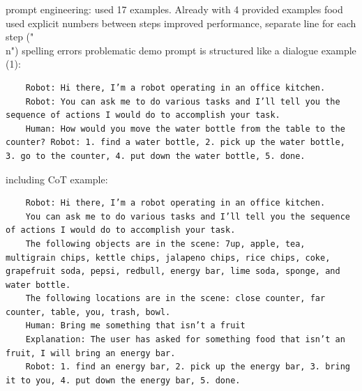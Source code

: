 \documentclass{article}
\begin{document}
prompt engineering:
used 17 examples. Already with 4 provided examples food
used explicit numbers between steps improved performance, separate line for each step ("\\n")
spelling errors problematic
demo prompt is structured like a dialogue
example (1):
\begin{verbatim}
	Robot: Hi there, I’m a robot operating in an office kitchen. 
	Robot: You can ask me to do various tasks and I’ll tell you the sequence of actions I would do to accomplish your task.
	Human: How would you move the water bottle from the table to the counter? Robot: 1. find a water bottle, 2. pick up the water bottle, 3. go to the counter, 4. put down the water bottle, 5. done.
\end{verbatim}
including CoT example: 
\begin{verbatim}
	Robot: Hi there, I’m a robot operating in an office kitchen. 
	You can ask me to do various tasks and I’ll tell you the sequence of actions I would do to accomplish your task. 
	The following objects are in the scene: 7up, apple, tea, multigrain chips, kettle chips, jalapeno chips, rice chips, coke, grapefruit soda, pepsi, redbull, energy bar, lime soda, sponge, and water bottle. 
	The following locations are in the scene: close counter, far counter, table, you, trash, bowl.
	Human: Bring me something that isn’t a fruit 
	Explanation: The user has asked for something food that isn’t an fruit, I will bring an energy bar. 
	Robot: 1. find an energy bar, 2. pick up the energy bar, 3. bring it to you, 4. put down the energy bar, 5. done.
\end{verbatim}
\end{document}
